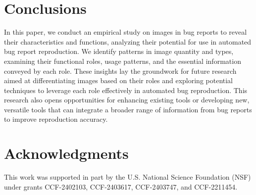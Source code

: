 \section{Conclusions}
\label{sec:conclusion}

In this paper, we conduct an empirical study on images in bug reports to reveal their characteristics and functions, analyzing their potential for use in automated bug report reproduction. We identify patterns in image quantity and types, examining their functional roles, usage patterns, and the essential information conveyed by each role. These insights lay the groundwork for future research aimed at differentiating images based on their roles and exploring potential techniques to leverage each role effectively in automated bug reproduction. This research also opens opportunities for enhancing existing tools or developing new, versatile tools that can integrate a broader range of information from bug reports to improve reproduction accuracy.


\section*{Acknowledgments}
This work was supported in part by the U.S. National
Science Foundation (NSF) under grants 
CCF-2402103, CCF-2403617, CCF-2403747, and CCF-2211454.